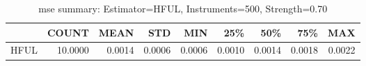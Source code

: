 \begin{table}[ht]
\centering
\caption{mse summary: Estimator=HFUL, Instruments=500, Strength=0.70}
\begin{tabular}{lrrrrrrrr}
\toprule
 & COUNT & MEAN & STD & MIN & 25\% & 50\% & 75\% & MAX \\
\midrule
HFUL & 10.0000 & 0.0014 & 0.0006 & 0.0006 & 0.0010 & 0.0014 & 0.0018 & 0.0022 \\
\bottomrule
\end{tabular}
\end{table}
